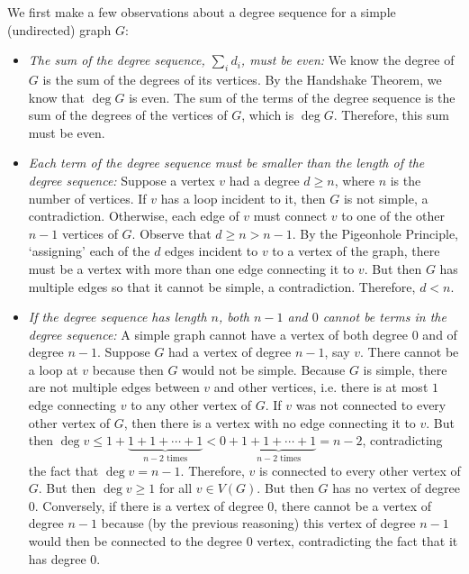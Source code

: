 \documentclass[11pt,letterpaper]{article}
\begin{document}
\sol We first make a few observations about a degree sequence for a simple (undirected) graph $G$:
	\begin{itemize}
	\item {\itshape The sum of the degree sequence, $\sum_i d_i$, must be even:} We know the degree of $G$ is the sum of the degrees of its vertices. By the Handshake Theorem, we know that $\deg G$ is even. The sum of the terms of the degree sequence is the sum of the degrees of the vertices of $G$, which is $\deg G$. Therefore, this sum must be even. 

	\item {\itshape Each term of the degree sequence must be smaller than the length of the degree sequence:} Suppose a vertex $v$ had a degree $d \geq n$, where $n$ is the number of vertices. If $v$ has a loop incident to it, then $G$ is not simple, a contradiction. Otherwise, each edge of $v$ must connect $v$ to one of the other $n - 1$ vertices of $G$. Observe that $d \geq n > n - 1$. By the Pigeonhole Principle, `assigning' each of the $d $ edges incident to $v$ to a vertex of the graph, there must be a vertex with more than one edge connecting it to $v$. But then $G$ has multiple edges so that it cannot be simple, a contradiction. Therefore, $d < n$. 

	\item {\itshape If the degree sequence has length $n$, both $n - 1$ and $0$ cannot be terms in the degree sequence:} A simple graph cannot have a vertex of both degree $0$ and of degree $n - 1$. Suppose $G$ had a vertex of degree $n - 1$, say $v$. There cannot be a loop at $v$ because then $G$ would not be simple. Because $G$ is simple, there are not multiple edges between $v$ and other vertices, i.e. there is at most $1$ edge connecting $v$ to any other vertex of $G$. If $v$ was not connected to every other vertex of $G$, then there is a vertex with no edge connecting it to $v$. But then $\deg v \leq 1 + \underbrace{1 + 1 + \cdots + 1}_{n - 2 \text{ times}} < 0 + \underbrace{1 + 1 + \cdots + 1}_{n - 2 \text{ times}}= n - 2$, contradicting the fact that $\deg v= n - 1$. Therefore, $v$ is connected to every other vertex of $G$. But then $\deg v \geq 1$ for all $v \in V(G)$. But then $G$ has no vertex of degree $0$. Conversely, if there is a vertex of degree $0$, there cannot be a vertex of degree $n - 1$ because (by the previous reasoning) this vertex of degree $n - 1$ would then be connected to the degree $0$ vertex, contradicting the fact that it has degree $0$.
	

\end{itemize}
\end{document}
